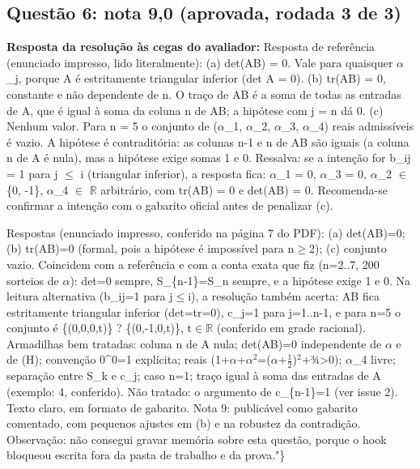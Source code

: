 \documentclass{article}%
\begin{document}
\subsection*{Questão 6: nota 9,0 (aprovada, rodada 3 de 3)}%
\textbf{Resposta da resolução às cegas do avaliador:} Resposta de referência (enunciado impresso, lido literalmente):\newline%
\newline%
(a) det(AB) = 0. Vale para quaisquer $\alpha$\_j, porque A é estritamente triangular inferior (det A = 0).\newline%
\newline%
(b) tr(AB) = 0, constante e não dependente de n. O traço de AB é a soma de todas as entradas de A, que é igual à soma da coluna n de AB; a hipótese com j = n dá 0.\newline%
\newline%
(c) Nenhum valor. Para n = 5 o conjunto de ($\alpha$\_1, $\alpha$\_2, $\alpha$\_3, $\alpha$\_4) reais admissíveis é vazio. A hipótese é contraditória: as colunas n-1 e n de AB são iguais (a coluna n de A é nula), mas a hipótese exige somas 1 e 0.\newline%
\newline%
Ressalva: se a intenção for b\_ij = 1 para j $\leq$ i (triangular inferior), a resposta fica: $\alpha$\_1 = 0, $\alpha$\_3 = 0, $\alpha$\_2 $\in$ \{0, -1\}, $\alpha$\_4 $\in$ $\mathbb{R}$ arbitrário, com tr(AB) = 0 e det(AB) = 0. Recomenda{-}se confirmar a intenção com o gabarito oficial antes de penalizar (c).\par %
Respostas (enunciado impresso, conferido na página 7 do PDF): (a) det(AB)=0; (b) tr(AB)=0 (formal, pois a hipótese é impossível para n$\geq$2); (c) conjunto vazio. Coincidem com a referência e com a conta exata que fiz (n=2..7, 200 sorteios de $\alpha$): det=0 sempre, S\_\{n{-}1\}=S\_n sempre, e a hipótese exige 1 e 0. Na leitura alternativa (b\_ij=1 para j$\leq$i), a resolução também acerta: AB fica estritamente triangular inferior (det=tr=0), c\_j=1 para j=1..n-1, e para n=5 o conjunto é \{(0,0,0,t)\} ? \{(0,-1,0,t)\}, t$\in$$\mathbb{R}$ (conferido em grade racional). Armadilhas bem tratadas: coluna n de A nula; det(AB)=0 independente de $\alpha$ e de (H); convenção 0\^{}0=1 explícita; reais (1+$\alpha$+$\alpha$$^2$=($\alpha$+$\frac12$)$^2$+¾>0); $\alpha$\_4 livre; separação entre S\_k e c\_j; caso n=1; traço igual à soma das entradas de A (exemplo: 4, conferido). Não tratado: o argumento de c\_\{n{-}1\}=1 (ver issue 2). Texto claro, em formato de gabarito. Nota 9: publicável como gabarito comentado, com pequenos ajustes em (b) e na robustez da contradição. Observação: não consegui gravar memória sobre esta questão, porque o hook bloqueou escrita fora da pasta de trabalho e da prova."\}%
\end{document}
